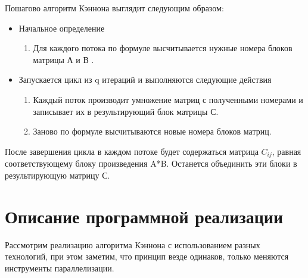 \documentclass{report}
\begin{document}
Пошагово алгоритм Кэннона выглядит следующим образом:
\begin{itemize}
\item Начальное определение
\begin{enumerate}
\item Для каждого потока по формуле высчитывается нужные номера блоков матрицы А и В .
\end{enumerate}
\end{itemize}
\begin{itemize}
\item Запускается цикл из q итераций и выполняются следующие действия
\begin{enumerate}
\item Каждый поток производит умножение матриц с полученными номерами и записывает их в результирующий блок матрицы С.
\item Заново по формуле высчитываются новые номера блоков матриц.
\end{enumerate}
\end{itemize}

После завершения цикла в каждом потоке будет содержаться матрица $C_{ij}$, равная соответствующему блоку произведения A*B. Останется объединить эти блоки в результирующую матрицу С.
\newpage

\section{\hspace{0.6cm}Описание программной реализации}
Рассмотрим реализацию алгоритма Кэннона с использованием разных технологий, при этом заметим, что принцип везде одинаков, только меняются инструменты параллелизации.
\end{document}

